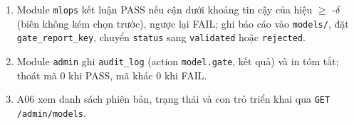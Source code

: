 \begin{enumerate}
\item Module {\small\texttt{mlops}} kết luận PASS nếu cận dưới khoảng tin cậy của hiệu \ensuremath{\geq} -\ensuremath{\delta} (biên không kém chọn trước), ngược lại FAIL; ghi báo cáo vào {\small\texttt{models/\allowbreak{}\allowbreak{}}}, đặt {\small\texttt{gate\_\allowbreak{}\allowbreak{}report\_\allowbreak{}\allowbreak{}key}}, chuyển {\small\texttt{status}} sang {\small\texttt{validated}} hoặc {\small\texttt{rejected}}.
\item Module {\small\texttt{admin}} ghi {\small\texttt{audit\_\allowbreak{}\allowbreak{}log}} (action {\small\texttt{model.\allowbreak{}gate}}, kết quả) và in tóm tắt; thoát mã 0 khi PASS, mã khác 0 khi FAIL.
\item A06 xem danh sách phiên bản, trạng thái và con trỏ triển khai qua {\small\texttt{GET /\allowbreak{}\allowbreak{}admin/\allowbreak{}\allowbreak{}models}}.
\end{enumerate}
